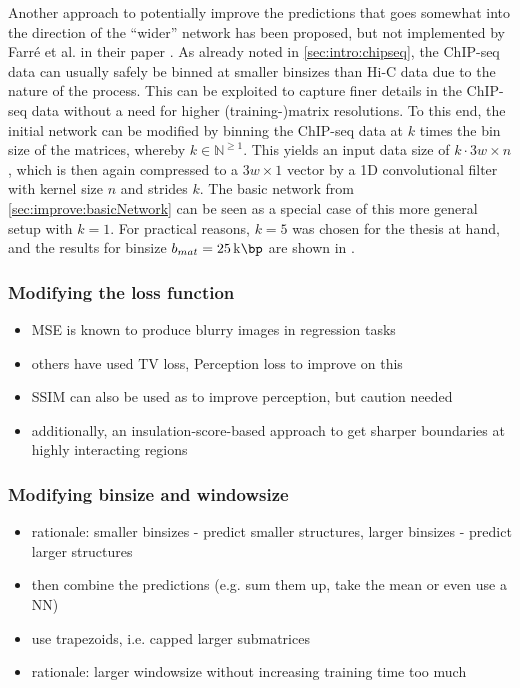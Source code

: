 Another approach to potentially improve the predictions that goes somewhat into
the direction of the ``wider'' network has been proposed, but not implemented by Farr\'e et al. 
in their paper \cite{Farre2018a}.
As already noted in \cref{sec:intro:chipseq}, the ChIP-seq data can usually
safely be binned at smaller binsizes than Hi-C data due to the nature of 
the process. 
This can be exploited to capture finer details in the ChIP-seq data without a need for higher (training-)matrix resolutions.
To this end, the initial network can be modified by binning the ChIP-seq data at $k$ times the bin size of the matrices, 
whereby $k \in \mathbb{N}^{\geq1}$. 
This yields an input data size of $k \cdot 3w \times n$, which is then again compressed to a $3w \times 1$ vector 
by a 1D convolutional filter with kernel size $n$ and strides $k$. 
The basic network from \cref{sec:improve:basicNetwork} can be seen as a special case of this more general setup
with $k=1$. 
For practical reasons, $k=5$ was chosen for the thesis at hand, 
and the results for binsize $b_{mat}=\SI{25}{\kilo\bp}$ are shown in \xxx.

\subsubsection{Modifying the loss function}
\begin{itemize}
 \item MSE is known to produce blurry images in regression tasks
 \item others have used TV loss, Perception loss to improve on this
 \item SSIM can also be used as to improve perception, but caution needed
 \item additionally, an insulation-score-based approach to get sharper boundaries 
            at highly interacting regions
\end{itemize}

\subsubsection{Modifying binsize and windowsize}
\begin{itemize}
 \item rationale: smaller binsizes - predict smaller structures, larger binsizes - predict larger structures
 \item then combine the predictions (e.g. sum them up, take the mean or even use a NN)
 \item use trapezoids, i.e. capped larger submatrices
 \item rationale: larger windowsize without increasing training time too much 
 \end{itemize}

